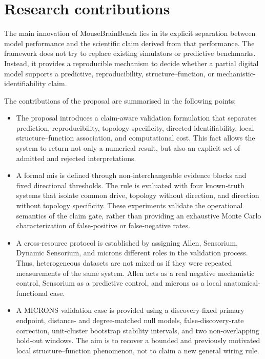 \section{Research contributions}
\label{sec:contributions}

The main innovation of MouseBrainBench lies in its explicit separation between
model performance and the scientific claim derived from that performance. The
framework does not try to replace existing simulators or predictive benchmarks.
Instead, it provides a reproducible mechanism to decide whether a partial digital
model supports a predictive, reproducibility, structure--function, or
mechanistic-identifiability claim.

The contributions of the proposal are summarised in the following points:

\begin{itemize}
  \item The proposal introduces a claim-aware validation formulation that
  separates prediction, reproducibility, topology specificity, directed
  identifiability, local structure--function association, and computational
  cost. This fact allows the system to return not only a numerical result, but
  also an explicit set of admitted and rejected interpretations.

  \item A formal \acs{mis} is defined through non-interchangeable evidence
  blocks and fixed directional thresholds. The rule is evaluated with four
  known-truth systems that isolate common drive, topology without direction, and
  direction without topology specificity. These experiments validate the
  operational semantics of the claim gate, rather than providing an exhaustive
  Monte Carlo characterization of false-positive or false-negative rates.

  \item A cross-resource protocol is established by assigning Allen,
  Sensorium, Dynamic Sensorium, and \acs{microns} different roles in the
  validation process. Thus, heterogeneous datasets are not mixed as if they were
  repeated measurements of the same system. Allen acts as a real negative
  mechanistic control, Sensorium as a predictive control, and \acs{microns} as a
  local anatomical-functional case.

  \item A MICRONS validation case is provided using a discovery-fixed primary
  endpoint, distance- and degree-matched null models, false-discovery-rate
  correction, unit-cluster bootstrap stability intervals, and two non-overlapping hold-out
  windows. The aim is to recover a bounded and previously motivated local
  structure--function phenomenon, not to claim a new general wiring rule.


\end{itemize}
